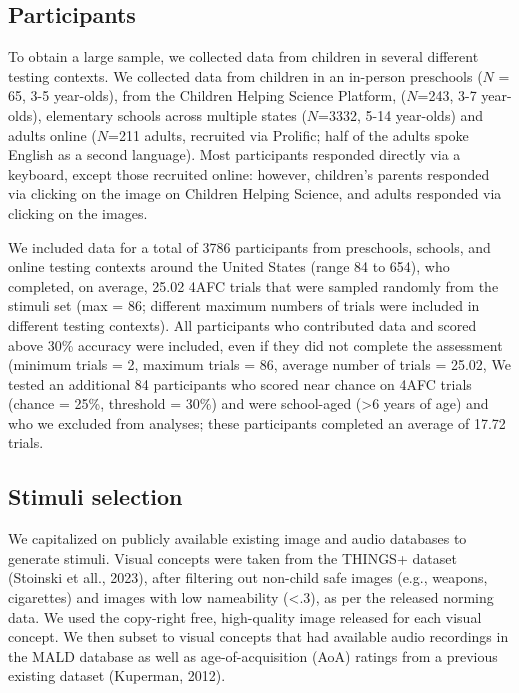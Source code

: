\documentclass[
  man,mask]{apa6}
\begin{document}
\subsection{Participants}\label{participants}

To obtain a large sample, we collected data from children in several different testing contexts. We collected data from children in an in-person preschools (\(N\) = 65, 3-5 year-olds), from the Children Helping Science Platform, (\(N\)=243, 3-7 year-olds), elementary schools across multiple states (\(N\)=3332, 5-14 year-olds) and adults online (\(N\)=211 adults, recruited via Prolific; half of the adults spoke English as a second language). Most participants responded directly via a keyboard, except those recruited online: however, children's parents responded via clicking on the image on Children Helping Science, and adults responded via clicking on the images.

We included data for a total of 3786 participants from preschools, schools, and online testing contexts around the United States (range 84 to 654), who completed, on average, 25.02 4AFC trials that were sampled randomly from the stimuli set (max = 86; different maximum numbers of trials were included in different testing contexts). All participants who contributed data and scored above 30\% accuracy were included, even if they did not complete the assessment (minimum trials = 2, maximum trials = 86, average number of trials = 25.02, We tested an additional 84 participants who scored near chance on 4AFC trials (chance = 25\%, threshold = 30\%) and were school-aged (\textgreater6 years of age) and who we excluded from analyses; these participants completed an average of 17.72 trials.

\subsection{Stimuli selection}\label{stimuli-selection}

We capitalized on publicly available existing image and audio databases to generate stimuli. Visual concepts were taken from the THINGS+ dataset (Stoinski et all., 2023), after filtering out non-child safe images (e.g., weapons, cigarettes) and images with low nameability (\textless.3), as per the released norming data. We used the copy-right free, high-quality image released for each visual concept. We then subset to visual concepts that had available audio recordings in the MALD database as well as age-of-acquisition (AoA) ratings from a previous existing dataset (Kuperman, 2012).
\end{document}
